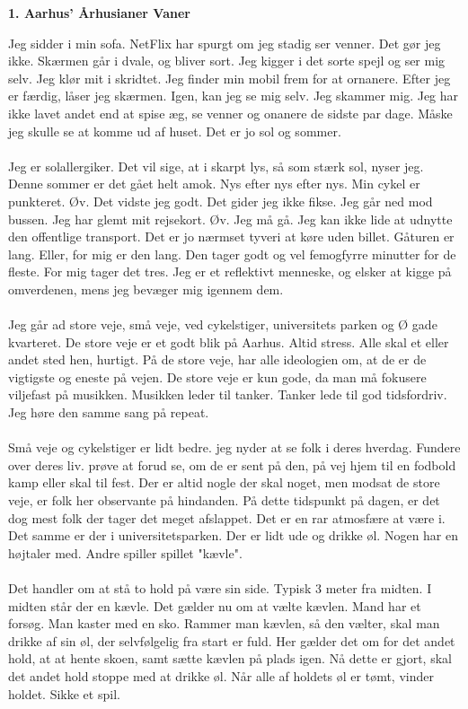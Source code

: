 \documentclass[]{article}
\begin{document}
\begin{center}
	\large\textbf{1. Aarhus' Århusianer Vaner}
\end{center}

Jeg sidder i min sofa. NetFlix har spurgt om jeg stadig ser venner. Det gør jeg ikke. Skærmen går i dvale, og bliver sort. Jeg kigger i det sorte spejl og ser mig selv. Jeg klør mit i skridtet. Jeg finder min mobil frem for at ornanere. Efter jeg er færdig, låser jeg skærmen. Igen, kan jeg se mig selv. Jeg skammer mig. Jeg har ikke lavet andet end at spise æg, se venner og onanere de sidste par dage. Måske jeg skulle se at komme ud af huset. Det er jo sol og sommer.
\\ \\
Jeg er solallergiker. Det vil sige, at i skarpt lys, så som stærk sol, nyser jeg. Denne sommer er det gået helt amok. Nys efter nys efter nys. Min cykel er punkteret. Øv. Det vidste jeg godt. Det gider jeg ikke fikse. Jeg går ned mod bussen. Jeg har glemt mit rejsekort. Øv. Jeg må gå. Jeg kan ikke lide at udnytte den offentlige transport. Det er jo nærmset tyveri at køre uden billet. Gåturen er lang. Eller, for mig er den lang. Den tager godt og vel femogfyrre minutter for de fleste. For mig tager det tres. Jeg er et reflektivt menneske, og elsker at kigge på omverdenen, mens jeg bevæger mig igennem dem.
\\ \\
Jeg går ad store veje, små veje, ved cykelstiger, universitets parken og Ø gade kvarteret. De store veje er et godt blik på Aarhus. Altid stress. Alle skal et eller andet sted hen, hurtigt. På de store veje, har alle ideologien om, at de er de vigtigste og eneste på vejen. De store veje er kun gode, da man må fokusere viljefast på musikken. Musikken leder til tanker. Tanker lede til god tidsfordriv. Jeg høre den samme sang på repeat.
\\ \\
Små veje og cykelstiger er lidt bedre. jeg nyder at se folk i deres hverdag. Fundere over deres liv. prøve at forud se, om de er sent på den, på vej hjem til en fodbold kamp eller skal til fest. Der er altid nogle der skal noget, men modsat de store veje, er folk her observante på hindanden. På dette tidspunkt på dagen, er det dog mest folk der tager det meget afslappet. Det er en rar atmosfære at være i. Det samme er der i universitetsparken. Der er lidt ude og drikke øl. Nogen har en højtaler med. Andre spiller spillet "kævle". 
\\ \\
Det handler om at stå to hold på være sin side. Typisk 3 meter fra midten. I midten står der en kævle. Det gælder nu om at vælte kævlen. Mand har et forsøg. Man kaster med en sko. Rammer man kævlen, så den vælter, skal man drikke af sin øl, der selvfølgelig fra start er fuld. Her gælder det om for det andet hold, at at hente skoen, samt sætte kævlen på plads igen. Nå dette er gjort, skal det andet hold stoppe med at drikke øl. Når alle af holdets øl er tømt, vinder holdet. Sikke et spil.
\end{document}
